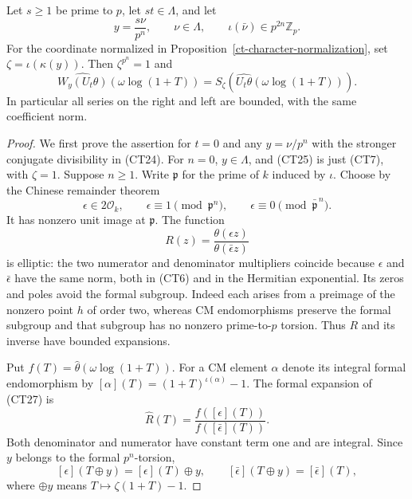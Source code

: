 \begin{theorem}\label{ct-power-translation}
Let $s\ge1$ be prime to $p$, let $st\in\Lambda$, and let
\[
 y=\frac{s\nu}{p^n},\qquad \nu\in\Lambda,\qquad
                     \iota(\bar\nu)\in p^{2n}\mathbb Z_p.
 \tag{CT24}
\]
For the coordinate normalized in
Proposition~\ref{ct-character-normalization}, set
$\zeta=\iota(\kappa(y))$.  Then $\zeta^{p^n}=1$ and
\[
 \widehat{W_y(U_t\theta)}(\omega\log(1+T))
       =S_\zeta\!\left(
                \widehat{U_t\theta}(\omega\log(1+T))\right).
 \tag{CT25}
\]
In particular all series on the right and left are bounded,
with the same coefficient norm.
\end{theorem}
\begin{proof}
We first prove the assertion for $t=0$ and any $y=\nu/p^n$
with the stronger conjugate divisibility in (CT24).
For $n=0$, $y\in\Lambda$, and (CT25) is just (CT7), with
$\zeta=1$.  Suppose $n\ge1$.  Write $\mathfrak p$ for the
prime of $k$ induced by $\iota$.  Choose by the Chinese
remainder theorem
\[
 \epsilon\in2\mathcal O_k,\qquad
 \epsilon\equiv1\pmod{\mathfrak p^n},\qquad
 \epsilon\equiv0\pmod{\bar{\mathfrak p}^{\,n}}.
 \tag{CT26}
\]
It has nonzero unit image at $\mathfrak p$.
The function
\[
                     R(z)=\frac{\theta(\epsilon z)}
                                      {\theta(\bar\epsilon z)}
 \tag{CT27}
\]
is elliptic: the two numerator and denominator multipliers
coincide because $\epsilon$ and $\bar\epsilon$ have the same
norm, both in (CT6) and in the Hermitian exponential.
Its zeros and poles avoid the formal subgroup.  Indeed each
arises from a preimage of the nonzero point $h$ of order two,
whereas CM endomorphisms preserve the formal subgroup and that
subgroup has no nonzero prime-to-$p$ torsion.
Thus $R$ and its inverse have bounded expansions.

Put $f(T)=\widehat\theta(\omega\log(1+T))$.
For a CM element $\alpha$ denote its integral formal
endomorphism by
$[\alpha](T)=(1+T)^{\iota(\alpha)}-1$.
The formal expansion of (CT27) is
\[
                   \widehat R(T)=
                   \frac{f([\epsilon](T))}{f([\bar\epsilon](T))}.
 \tag{CT28}
\]
Both denominator and numerator have constant term one and are
integral.  Since $y$ belongs to the formal $p^n$-torsion,
\[
 [\epsilon](T\mathbin\oplus y)
     =[\epsilon](T)\mathbin\oplus y,\qquad
 [\bar\epsilon](T\mathbin\oplus y)=[\bar\epsilon](T),
\]
where $\oplus y$ means $T\mapsto\zeta(1+T)-1$.


\end{proof}
